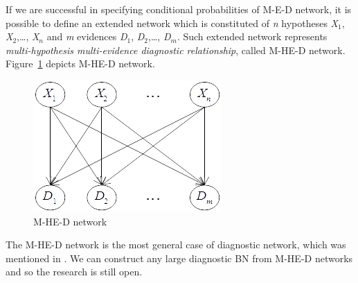 \documentclass{article}
\numberwithin{equation}{section}
\numberwithin{figure}{section}
\numberwithin{table}{section}
\begin{document}
If we are successful in specifying conditional probabilities of M-E-D network, it is possible to define an extended network which is constituted of \textit{n} hypotheses \textit{X}${}_{1}$, \textit{X}${}_{2}$,{\dots}, \textit{X${}_{n}$} and \textit{m} evidences \textit{D}${}_{1}$, \textit{D}${}_{2}$,{\dots}, \textit{D${}_{m}$}. Such extended network represents \textit{multi-hypothesis multi-evidence diagnostic relationship}, called M-HE-D network. Figure~\ref{figure:mhed-network} depicts M-HE-D network.

\begin{figure}
\centering
\includegraphics{MHEDNetwork.png}
\caption{M-HE-D network}
\label{figure:mhed-network}
\end{figure}

The M-HE-D network is the most general case of diagnostic network, which was mentioned in \cite{millan:bayesiandiagnostic}. We can construct any large diagnostic BN from M-HE-D networks and so the research is still open.
\end{document}
